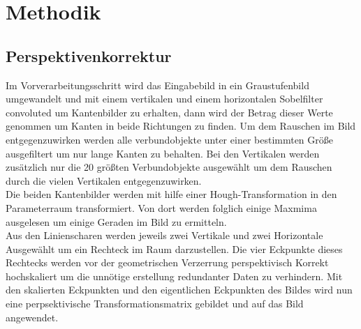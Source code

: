 \documentclass[paper=A4, deutsch]{scrartcl}
\begin{document}

\section{Methodik}

\subsection{Perspektivenkorrektur}
Im Vorverarbeitungsschritt wird das Eingabebild in ein Graustufenbild umgewandelt und mit einem vertikalen und einem horizontalen Sobelfilter convoluted um Kantenbilder zu erhalten, dann wird der Betrag dieser Werte genommen um Kanten in beide Richtungen zu finden. Um dem Rauschen im Bild entgegenzuwirken werden alle verbundobjekte unter einer bestimmten Größe ausgefiltert um nur lange Kanten zu behalten. Bei den Vertikalen werden zusätzlich nur die 20 größten Verbundobjekte ausgewählt um dem Rauschen durch die vielen Vertikalen entgegenzuwirken.\\
Die beiden Kantenbilder werden mit hilfe einer Hough-Transformation in den Parameterraum transformiert. Von dort werden folglich einige Maxmima ausgelesen um einige Geraden im Bild zu ermitteln.\\
Aus den Linienscharen werden jeweils zwei Vertikale und zwei Horizontale Ausgewählt um ein Rechteck im Raum darzustellen. Die vier Eckpunkte dieses Rechtecks werden vor der geometrischen Verzerrung perspektivisch Korrekt hochskaliert um die unnötige erstellung redundanter Daten zu verhindern. Mit den skalierten Eckpunkten und den eigentlichen Eckpunkten des Bildes wird nun eine perpsektivische Transformationsmatrix gebildet und auf das Bild angewendet.\\
\end{document}
